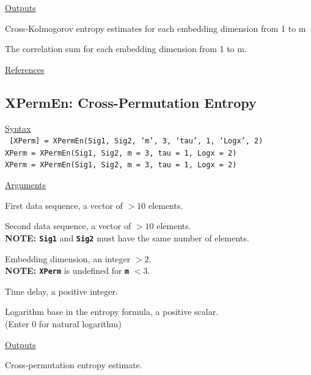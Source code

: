 \documentclass[12pt, a4paper, titlepage, openany]{book}
\begin{document}
\noindent \ul{Outputs}
\begin{description}[labelsep=1cm, labelwidth=2cm, nosep, style=multiline,leftmargin=3cm]\footnotesize
\item[\texttt{XK2}]		Cross-Kolmogorov entropy estimates for each embedding dimension from 1 to m
\item[\texttt{Ci}]		The correlation sum for each embedding dimension from 1 to m.
\end{description}

\noindent \ul{References}\hspace{1cm}
\cite{Matt1}



\newpage
\subsection{\normalsize XPermEn: \hspace{15mm} Cross-Permutation Entropy}
\noindent\ul{Syntax} \vspace{6mm} \\ \noindent \texttt{\footnotesize
[XPerm] = XPermEn(Sig1, Sig2, ‘m’, 3, ‘tau’, 1, ‘Logx’, 2)\\
 XPerm  = XPermEn(Sig1, Sig2, m = 3, tau = 1, Logx = 2)\\
 XPerm  = XPermEn(Sig1, Sig2, m = 3, tau = 1, Logx = 2)}

\noindent \ul{Arguments}
\begin{description}[labelsep=1cm, labelwidth=2cm, nosep,,style=multiline,leftmargin=3cm]\footnotesize
\item[\texttt{Sig1}]	First data sequence, a vector of $>10$ elements.
\item[\texttt{Sig2}]	Second data sequence, a vector of $>10$ elements.\\
\textbf{NOTE: \texttt{Sig1}} and \textbf{\texttt{Sig2}} must have the same number of elements.
\item[\texttt{m}]		Embedding dimension, an integer $> 2$.\\
\textbf{NOTE: \texttt{XPerm}} is undefined for \texttt{\textbf{m}} $< 3$.
\item[\texttt{tau}]		Time delay, a positive integer.
\item[\texttt{Logx}]	Logarithm base in the entropy formula, a positive scalar.\\
(Enter 0 for natural logarithm)
\end{description}

\noindent \ul{Outputs}
\begin{description}[labelsep=1cm, labelwidth=2cm, nosep, style=multiline,leftmargin=3cm]\footnotesize
\item[\texttt{XPerm}]		Cross-permutation entropy estimate.\\
\end{description}
\end{document}
